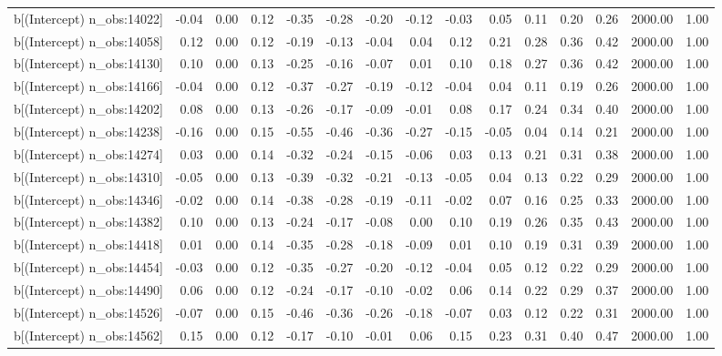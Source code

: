 \begin{table}[ht]
\begin{tabular}{rrrrrrrrrrrrrrr}
  b[(Intercept) n\_obs:14022] & -0.04 & 0.00 & 0.12 & -0.35 & -0.28 & -0.20 & -0.12 & -0.03 & 0.05 & 0.11 & 0.20 & 0.26 & 2000.00 & 1.00 \\ 
  b[(Intercept) n\_obs:14058] & 0.12 & 0.00 & 0.12 & -0.19 & -0.13 & -0.04 & 0.04 & 0.12 & 0.21 & 0.28 & 0.36 & 0.42 & 2000.00 & 1.00 \\ 
  b[(Intercept) n\_obs:14130] & 0.10 & 0.00 & 0.13 & -0.25 & -0.16 & -0.07 & 0.01 & 0.10 & 0.18 & 0.27 & 0.36 & 0.42 & 2000.00 & 1.00 \\ 
  b[(Intercept) n\_obs:14166] & -0.04 & 0.00 & 0.12 & -0.37 & -0.27 & -0.19 & -0.12 & -0.04 & 0.04 & 0.11 & 0.19 & 0.26 & 2000.00 & 1.00 \\ 
  b[(Intercept) n\_obs:14202] & 0.08 & 0.00 & 0.13 & -0.26 & -0.17 & -0.09 & -0.01 & 0.08 & 0.17 & 0.24 & 0.34 & 0.40 & 2000.00 & 1.00 \\ 
  b[(Intercept) n\_obs:14238] & -0.16 & 0.00 & 0.15 & -0.55 & -0.46 & -0.36 & -0.27 & -0.15 & -0.05 & 0.04 & 0.14 & 0.21 & 2000.00 & 1.00 \\ 
  b[(Intercept) n\_obs:14274] & 0.03 & 0.00 & 0.14 & -0.32 & -0.24 & -0.15 & -0.06 & 0.03 & 0.13 & 0.21 & 0.31 & 0.38 & 2000.00 & 1.00 \\ 
  b[(Intercept) n\_obs:14310] & -0.05 & 0.00 & 0.13 & -0.39 & -0.32 & -0.21 & -0.13 & -0.05 & 0.04 & 0.13 & 0.22 & 0.29 & 2000.00 & 1.00 \\ 
  b[(Intercept) n\_obs:14346] & -0.02 & 0.00 & 0.14 & -0.38 & -0.28 & -0.19 & -0.11 & -0.02 & 0.07 & 0.16 & 0.25 & 0.33 & 2000.00 & 1.00 \\ 
  b[(Intercept) n\_obs:14382] & 0.10 & 0.00 & 0.13 & -0.24 & -0.17 & -0.08 & 0.00 & 0.10 & 0.19 & 0.26 & 0.35 & 0.43 & 2000.00 & 1.00 \\ 
  b[(Intercept) n\_obs:14418] & 0.01 & 0.00 & 0.14 & -0.35 & -0.28 & -0.18 & -0.09 & 0.01 & 0.10 & 0.19 & 0.31 & 0.39 & 2000.00 & 1.00 \\ 
  b[(Intercept) n\_obs:14454] & -0.03 & 0.00 & 0.12 & -0.35 & -0.27 & -0.20 & -0.12 & -0.04 & 0.05 & 0.12 & 0.22 & 0.29 & 2000.00 & 1.00 \\ 
  b[(Intercept) n\_obs:14490] & 0.06 & 0.00 & 0.12 & -0.24 & -0.17 & -0.10 & -0.02 & 0.06 & 0.14 & 0.22 & 0.29 & 0.37 & 2000.00 & 1.00 \\ 
  b[(Intercept) n\_obs:14526] & -0.07 & 0.00 & 0.15 & -0.46 & -0.36 & -0.26 & -0.18 & -0.07 & 0.03 & 0.12 & 0.22 & 0.31 & 2000.00 & 1.00 \\ 
  b[(Intercept) n\_obs:14562] & 0.15 & 0.00 & 0.12 & -0.17 & -0.10 & -0.01 & 0.06 & 0.15 & 0.23 & 0.31 & 0.40 & 0.47 & 2000.00 & 1.00 \\ 

\end{tabular}
\end{table}
